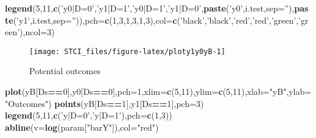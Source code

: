 \documentclass[]{book}
\newenvironment{Shaded}{\begin{snugshade}}{\end{snugshade}}
\newcommand{\KeywordTok}[1]{\textcolor[rgb]{0.13,0.29,0.53}{\textbf{#1}}}
\newcommand{\DataTypeTok}[1]{\textcolor[rgb]{0.13,0.29,0.53}{#1}}
\newcommand{\DecValTok}[1]{\textcolor[rgb]{0.00,0.00,0.81}{#1}}
\newcommand{\StringTok}[1]{\textcolor[rgb]{0.31,0.60,0.02}{#1}}
\newcommand{\OperatorTok}[1]{\textcolor[rgb]{0.81,0.36,0.00}{\textbf{#1}}}
\newcommand{\NormalTok}[1]{#1}
\theoremstyle{definition}
\theoremstyle{definition}
\theoremstyle{definition}
\theoremstyle{remark}
\begin{document}
\begin{Shaded}
\begin{Highlighting}[]
\KeywordTok{legend}\NormalTok{(}\DecValTok{5}\NormalTok{,}\DecValTok{11}\NormalTok{,}\KeywordTok{c}\NormalTok{(}\StringTok{'y0|D=0'}\NormalTok{,}\StringTok{'y1|D=1'}\NormalTok{,}\StringTok{'y0|D=1'}\NormalTok{,}\StringTok{'y1|D=0'}\NormalTok{,}\KeywordTok{paste}\NormalTok{(}\StringTok{'y0'}\NormalTok{,i.test,}\DataTypeTok{sep=}\StringTok{''}\NormalTok{),}\KeywordTok{paste}\NormalTok{(}\StringTok{'y1'}\NormalTok{,i.test,}\DataTypeTok{sep=}\StringTok{''}\NormalTok{)),}\DataTypeTok{pch=}\KeywordTok{c}\NormalTok{(}\DecValTok{1}\NormalTok{,}\DecValTok{3}\NormalTok{,}\DecValTok{1}\NormalTok{,}\DecValTok{3}\NormalTok{,}\DecValTok{1}\NormalTok{,}\DecValTok{3}\NormalTok{),}\DataTypeTok{col=}\KeywordTok{c}\NormalTok{(}\StringTok{'black'}\NormalTok{,}\StringTok{'black'}\NormalTok{,}\StringTok{'red'}\NormalTok{,}\StringTok{'red'}\NormalTok{,}\StringTok{'green'}\NormalTok{,}\StringTok{'green'}\NormalTok{),}\DataTypeTok{ncol=}\DecValTok{3}\NormalTok{)}
\end{Highlighting}
\end{Shaded}

\begin{figure}

{\centering \texttt{[image: STCI\_files/figure-latex/ploty1y0yB-1]} 

}

\caption{Potential outcomes}\label{fig:ploty1y0yB}
\end{figure}

\begin{Shaded}
\begin{Highlighting}[]
\KeywordTok{plot}\NormalTok{(yB[Ds}\OperatorTok{==}\DecValTok{0}\NormalTok{],y0[Ds}\OperatorTok{==}\DecValTok{0}\NormalTok{],}\DataTypeTok{pch=}\DecValTok{1}\NormalTok{,}\DataTypeTok{xlim=}\KeywordTok{c}\NormalTok{(}\DecValTok{5}\NormalTok{,}\DecValTok{11}\NormalTok{),}\DataTypeTok{ylim=}\KeywordTok{c}\NormalTok{(}\DecValTok{5}\NormalTok{,}\DecValTok{11}\NormalTok{),}\DataTypeTok{xlab=}\StringTok{"yB"}\NormalTok{,}\DataTypeTok{ylab=}\StringTok{"Outcomes"}\NormalTok{)}
\KeywordTok{points}\NormalTok{(yB[Ds}\OperatorTok{==}\DecValTok{1}\NormalTok{],y1[Ds}\OperatorTok{==}\DecValTok{1}\NormalTok{],}\DataTypeTok{pch=}\DecValTok{3}\NormalTok{)}
\KeywordTok{legend}\NormalTok{(}\DecValTok{5}\NormalTok{,}\DecValTok{11}\NormalTok{,}\KeywordTok{c}\NormalTok{(}\StringTok{'y|D=0'}\NormalTok{,}\StringTok{'y|D=1'}\NormalTok{),}\DataTypeTok{pch=}\KeywordTok{c}\NormalTok{(}\DecValTok{1}\NormalTok{,}\DecValTok{3}\NormalTok{))}
\KeywordTok{abline}\NormalTok{(}\DataTypeTok{v=}\KeywordTok{log}\NormalTok{(param[}\StringTok{"barY"}\NormalTok{]),}\DataTypeTok{col=}\StringTok{"red"}\NormalTok{)}
\end{Highlighting}
\end{Shaded}
\end{document}
